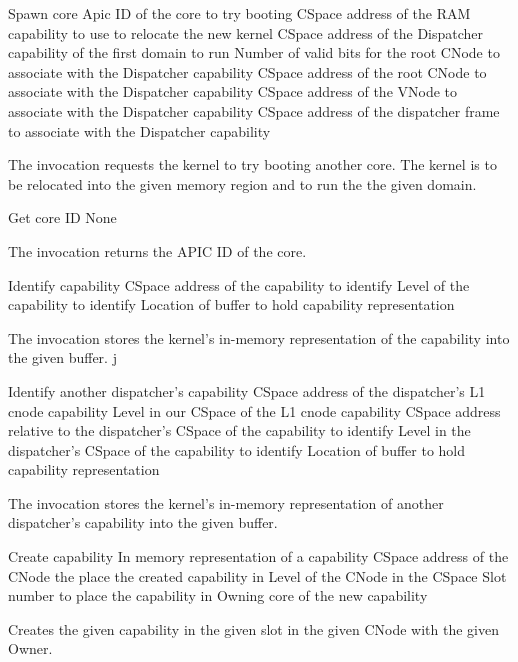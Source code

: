 \begin{invocation}{Spawn core}
  \arg Apic ID of the core to try booting
  \arg CSpace address of the RAM capability to use to relocate the new kernel
  \arg CSpace address of the Dispatcher capability of the first domain to run
  \arg Number of valid bits for the root CNode to associate with the Dispatcher capability
  \arg CSpace address of the root CNode to associate with the Dispatcher capability
  \arg CSpace address of the VNode to associate with the Dispatcher capability
  \arg CSpace address of the dispatcher frame to associate with the Dispatcher capability
\end{invocation}
The invocation requests the kernel to try booting another core.  The
kernel is to be relocated into the given memory region and to run the
the given domain.

\begin{invocation}{Get core ID}
  \arg None
\end{invocation}
The invocation returns the APIC ID of the core.

\begin{invocation}{Identify capability}
  \arg CSpace address of the capability to identify
  \arg Level of the capability to identify
  \arg Location of buffer to hold capability representation
\end{invocation}
The invocation stores the kernel's in-memory representation of the
capability into the given buffer.
j
\begin{invocation}{Identify another dispatcher's capability}
  \arg CSpace address of the dispatcher's L1 cnode capability
  \arg Level in our CSpace of the L1 cnode capability
  \arg CSpace address relative to the dispatcher's CSpace of the capability to
  identify
  \arg Level in the dispatcher's CSpace of the capability to identify
  \arg Location of buffer to hold capability representation
\end{invocation}
The invocation stores the kernel's in-memory representation of another
dispatcher's capability into the given buffer.

\begin{invocation}{Create capability}
  \arg In memory representation of a capability
  \arg CSpace address of the CNode the place the created capability in
  \arg Level of the CNode in the CSpace
  \arg Slot number to place the capability in
  \arg Owning core of the new capability
\end{invocation}
Creates the given capability in the given slot in the given CNode with the
given Owner.

